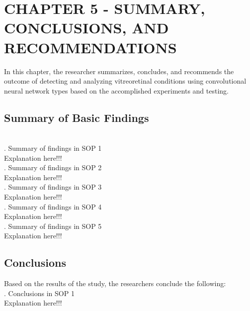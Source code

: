 


\chapter{\uppercase {\textbf{Chapter 5 - Summary, Conclusions, and Recommendations}}}

In this chapter, the researcher summarizes, concludes, and recommends the outcome of detecting and analyzing vitreoretinal conditions using convolutional neural network types based on the accomplished experiments and testing. \\

\section{Summary of Basic Findings} \\ 

. Summary of findings in SOP 1 \\
\indent Explanation here!!! \lipsum[1] \\

. Summary of findings in SOP 2 \\
\indent Explanation here!!! \lipsum[1] \\

. Summary of findings in SOP 3 \\
\indent Explanation here!!! \lipsum[1] \\

. Summary of findings in SOP 4 \\
\indent Explanation here!!! \lipsum[1] \\

. Summary of findings in SOP 5 \\
\indent Explanation here!!! \lipsum[1] \\

\section{Conclusions}
Based on the results of the study, the researchers conclude the following: \\

. Conclusions in SOP 1 \\
\indent Explanation here!!! \lipsum[1] \\

